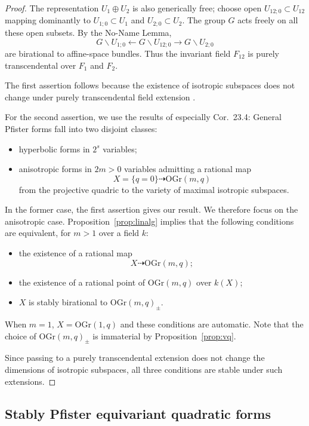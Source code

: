\documentclass[12pt]{amsart}
\numberwithin{equation}{section}
\newcommand{\OGr}{\mathrm{OGr}}
\theoremstyle{plain}
\theoremstyle{definition}
\theoremstyle{remark}
\begin{document}
\begin{proof}
The representation $U_1\oplus U_2$ is also generically free;
choose open $U_{12;0} \subset U_{12}$ mapping dominantly to
$U_{1;0} \subset U_1$ and $U_{2;0} \subset U_2$. The group
$G$ acts freely on all these open subsets. 
By the No-Name Lemma,
$$G \backslash U_{1;0} \longleftarrow 
G \backslash U_{12;0} \longrightarrow G\backslash U_{2;0}$$
are birational to affine-space bundles. Thus the invariant field $F_{12}$ is purely transcendental
over $F_1$ and $F_2$.

The first assertion follows because the existence of 
isotropic subspaces does not change under purely transcendental
field extension \cite[1.21,7.15]{EKMbook}. 

For the second assertion, we use the results of \cite[\S{23}]{EKMbook} especially Cor.~23.4: General Pfister forms fall into two disjoint classes:
\begin{itemize}
\item{hyperbolic forms in $2^s$ variables;}
\item{anisotropic forms in $2m>0$ variables admitting 
a rational map 
$$X=\{q=0\} \dashrightarrow \OGr(m,q)$$
from the projective quadric to the variety of maximal isotropic subspaces.}
\end{itemize}
In the former case, the first assertion gives our result.
We therefore focus on the anisotropic case. 
Proposition~\ref{prop:linalg} implies that the 
following conditions are equivalent, for $m>1$ over a field $k$:
\begin{itemize}
\item{
the existence of a rational map
$$X \dashrightarrow \OGr(m,q);$$}
\item{the existence of a rational point of $\OGr(m,q)$
over $k(X)$;}
\item{$X$ is stably birational to $\OGr(m,q)_{\pm}$.}
\end{itemize}
When $m=1$, $X=\OGr(1,q)$ and these conditions are automatic.
Note that the choice of $\OGr(m,q)_{\pm}$ is 
immaterial by Proposition~\ref{prop:vq}.  

Since passing to a purely transcendental extension does not
change the dimensions of isotropic subspaces, all three
conditions are stable under such extensions.
\end{proof}

  
\subsection*{Stably Pfister equivariant quadratic forms}
\end{document}
